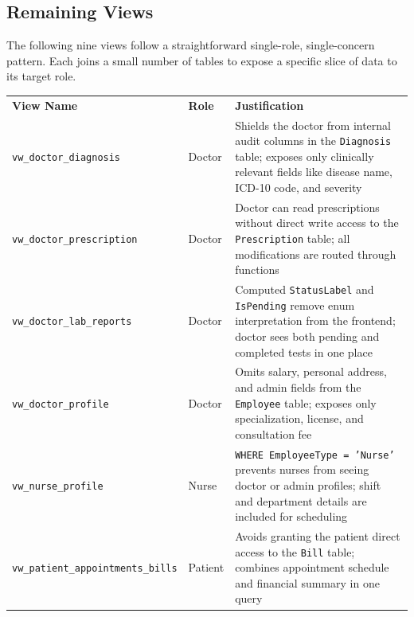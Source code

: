 \documentclass{article}
\newcommand{\theadcell}{\color{white}\bfseries}
\begin{document}
\newpage
\subsection{Remaining Views}

The following nine views follow a straightforward single-role, single-concern pattern. Each joins a small number of tables to expose a specific slice of data to its target role.

\begin{center}
\renewcommand{\arraystretch}{1.8}
\begin{tabular}{L{3.2cm} C{1.3cm} L{8cm}}
  \theadcell View Name & \theadcell Role & \theadcell Justification \\

  \texttt{vw\_doctor\_diagnosis} & Doctor &
  Shields the doctor from internal audit columns in the \texttt{Diagnosis} table; exposes only clinically relevant fields like disease name, ICD-10 code, and severity \\

  \texttt{vw\_doctor\_prescription} & Doctor &
  Doctor can read prescriptions without direct write access to the \texttt{Prescription} table; all modifications are routed through functions \\

  \texttt{vw\_doctor\_lab\_reports} & Doctor &
  Computed \texttt{StatusLabel} and \texttt{IsPending} remove enum interpretation from the frontend; doctor sees both pending and completed tests in one place \\

  \texttt{vw\_doctor\_profile} & Doctor &
  Omits salary, personal address, and admin fields from the \texttt{Employee} table; exposes only specialization, license, and consultation fee \\

  \texttt{vw\_nurse\_profile} & Nurse &
  \texttt{WHERE EmployeeType = 'Nurse'} prevents nurses from seeing doctor or admin profiles; shift and department details are included for scheduling \\

  \texttt{vw\_patient\_appointments\_bills} & Patient &
  Avoids granting the patient direct access to the \texttt{Bill} table; combines appointment schedule and financial summary in one query \\


\end{tabular}
\end{center}
\end{document}
